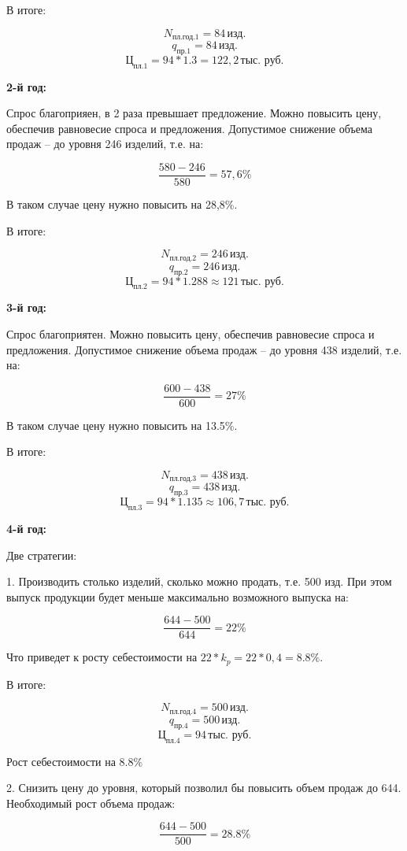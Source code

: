 В итоге:

\[
N_{\text{пл.год.1}} = 84 \, \text{изд.}
\]
\[
q_{\text{пр.1}} = 84 \, \text{изд.}
\]
\[
\text{Ц}_{\text{пл.1}} = 94 * 1.3 = 122,2 \, \text{тыс. руб.}
\]

\textbf{2-й год:}

Спрос благоприяен, в 2 раза превышает предложение. Можно повысить цену, обеспечив
равновесие спроса и предложения. Допустимое снижение объема продаж -- до уровня
246 изделий, т.е. на:

\[
\frac{580 - 246}{580} = 57,6\%
\]

В таком случае цену нужно повысить на 28,8\%.

В итоге:

\[
N_{\text{пл.год.2}} = 246 \, \text{изд.}
\]
\[
q_{\text{пр.2}} = 246 \, \text{изд.}
\]
\[
\text{Ц}_{\text{пл.2}} = 94 * 1.288 \approx 121 \, \text{тыс. руб.}
\]

\textbf{3-й год:}

Спрос благоприятен. Можно повысить цену, обеспечив равновесие спроса и
предложения. Допустимое снижение объема продаж -- до уровня 438 изделий, т.е. на:

\[
\frac{600 - 438}{600} = 27\%
\]

В таком случае цену нужно повысить на 13.5\%.

В итоге:

\[
N_{\text{пл.год.3}} = 438 \, \text{изд.}
\]
\[
q_{\text{пр.3}} = 438 \, \text{изд.}
\]
\[
\text{Ц}_{\text{пл.3}} = 94 * 1.135 \approx 106,7 \, \text{тыс. руб.}
\]

\textbf{4-й год:}

Две стратегии:

1. Производить столько изделий, сколько можно продать, т.е. 500 изд. При этом
выпуск продукции будет меньше максимально возможного выпуска на:

\[
\frac{644 - 500}{644} = 22\%
\]

Что приведет к росту себестоимости на $22 * k_p = 22 * 0,4 = 8.8\%$.

В итоге:

\[
N_{\text{пл.год.4}} = 500 \, \text{изд.}
\]
\[
q_{\text{пр.4}} = 500 \, \text{изд.}
\]
\[
\text{Ц}_{\text{пл.4}} = 94 \, \text{тыс. руб.}
\]

Рост себестоимости на 8.8\%

2. Снизить цену до уровня, который позволил бы повысить объем продаж до 644.
Необходимый рост объема продаж:

\[
\frac{644-500}{500} = 28.8\%
\]

